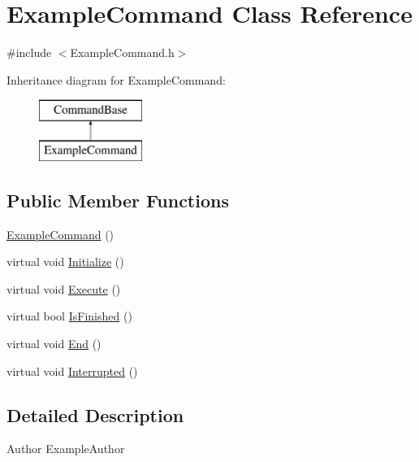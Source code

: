 \hypertarget{class_example_command}{\section{\-Example\-Command \-Class \-Reference}
\label{class_example_command}
}


{\ttfamily \#include $<$\-Example\-Command.\-h$>$}

\-Inheritance diagram for \-Example\-Command\-:\begin{figure}[H]
\begin{center}
\leavevmode
\includegraphics[height=2.000000cm]{class_example_command}
\end{center}
\end{figure}
\subsection*{\-Public \-Member \-Functions}
\begin{DoxyCompactItemize}
\item 
\hyperlink{class_example_command_ad91449e429d7da554dd5d984a0874a24}{\-Example\-Command} ()
\item 
virtual void \hyperlink{class_example_command_a212ebaa8787be1d969df8baad33e773e}{\-Initialize} ()
\item 
virtual void \hyperlink{class_example_command_a660f54d7a94499d134eda80c0247a86d}{\-Execute} ()
\item 
virtual bool \hyperlink{class_example_command_a3fb5743096b8ecf222dac4217df29f3f}{\-Is\-Finished} ()
\item 
virtual void \hyperlink{class_example_command_a462af4143f6a5d62ffcfa7c1bb2d045f}{\-End} ()
\item 
virtual void \hyperlink{class_example_command_a3a7220e2adf254aa788a837e38064c9e}{\-Interrupted} ()
\end{DoxyCompactItemize}


\subsection{\-Detailed \-Description}
\begin{DoxyAuthor}{\-Author}
\-Example\-Author 
\end{DoxyAuthor}


